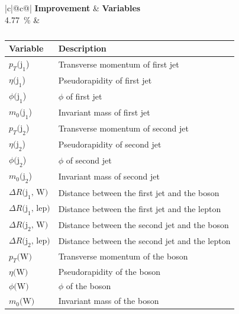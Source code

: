 \begin{table}[h]
    \centering
    \label{tab:app_vars_3}
    \caption{}
    \begin{tabular}{ |c|@{}c@{}| }
        \hline
        \textbf{Improvement} & \textbf{Variables}\\
        \hline
        \SI{4.77}{\%} & 
        \begin{tabular}{ll}
            \hline
            Variable & Description\\
            \hline
            $p_T\text{(j}_\text{1}$) & Transverse momentum of first jet\\
            $\eta\text{(j}_\text{1}$) & Pseudorapidity of first jet\\
            $\phi\text{(j}_\text{1}$) & $\phi$ of first jet\\
            $m_0\text{(j}_\text{1}$) & Invariant mass of first jet\\

            $p_T\text{(j}_\text{2}$) & Transverse momentum of second jet\\
            $\eta\text{(j}_\text{2}$) & Pseudorapidity of second jet\\
            $\phi\text{(j}_\text{2}$) & $\phi$ of second jet\\
            $m_0\text{(j}_\text{2}$) & Invariant mass of second jet\\

            $\Delta R\text{(j}_\text{1}\text{, W)}$ & Distance between the first jet and the \PWplus boson\\
            $\Delta R\text{(j}_\text{1}\text{, lep)}$ & Distance between the first jet and the lepton\\
            $\Delta R\text{(j}_\text{2}\text{, W)}$ & Distance between the second jet and the \PWplus boson\\
            $\Delta R\text{(j}_\text{2}\text{, lep)}$ & Distance between the second jet and the lepton\\

            $p_T\text{(W)}$ & Transverse momentum of the \PWplus boson\\
            $\eta\text{(W)}$ & Pseudorapidity of the \PWplus boson\\
            $\phi\text{(W)}$ & $\phi$ of the \PWplus boson\\
            $m_0\text{(W)}$ & Invariant mass of the \PWplus boson\\
            \hline
        \end{tabular}\\
        \hline
    \end{tabular}
\end{table}

